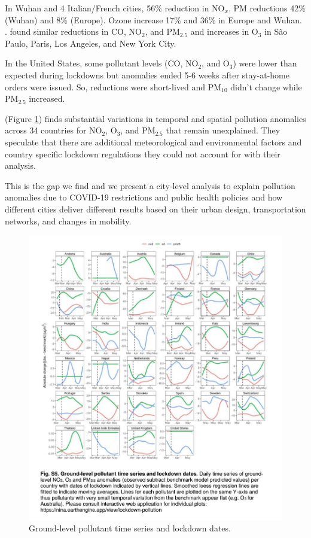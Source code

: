 \documentclass[final,3p,times,authoryear]{elsarticle}
\begin{document}
In Wuhan and 4 Italian/French cities, 56\% reduction in NO$_{x}$. PM reductions 42\% (Wuhan) and 8\% (Europe). Ozone increase 17\% and 36\% in Europe and Wuhan. \citep{Sicard2020}. \citet{Connerton2020} found similar reductions in CO, NO$_{2}$, and PM$_{2.5}$ and increases in O$_{3}$ in S\~{a}o Paulo, Paris, Los Angeles, and New York City. 

In the United States, some pollutant levels (CO, NO$_{2}$, and O$_{3}$) were lower than expected during lockdowns but anomalies ended 5-6 weeks after stay-at-home orders were issued. So, reductions were short-lived and PM$_{10}$ didn't change while PM$_{2.5}$ increased. \citep{Bekbulat2020}


\citet{Venter2020a} (Figure \ref{fig:Venter2020}) finds substantial variations in temporal and spatial pollution anomalies across 34 countries for NO$_{2}$, O$_{3}$, and PM$_{2.5}$ that remain unexplained. They speculate that there are additional meteorological and environmental factors and country specific lockdown regulations they could not account for with their analysis. 

This is the gap we find and we present a city-level analysis to explain pollution anomalies due to COVID-19 restrictions and public health policies and how different cities deliver different results based on their urban design, transportation networks, and changes in mobility.


\begin{figure}
\centering
\includegraphics[width=.99\linewidth]{images/Venter2020-FigS5.png}
\caption{Ground-level pollutant time series and lockdown dates.}
 \label{fig:Venter2020}
\end{figure} 
\end{document}
